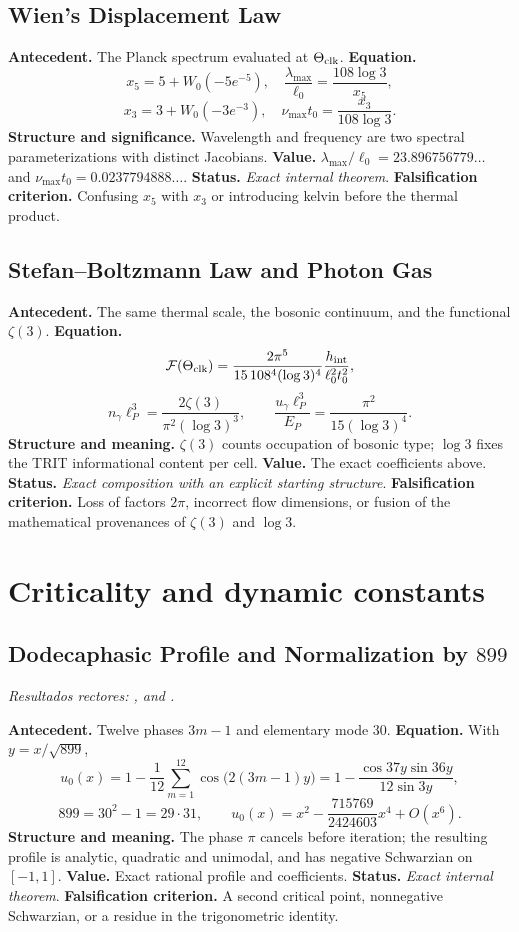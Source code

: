 \subsection*{Wien's Displacement Law }
\textbf{Antecedent.} The Planck spectrum evaluated at
\(\Theta_{\rm clk}\). \textbf{Equation.}
\[
x_5=5+W_0(-5e^{-5}),\quad
\frac{\lambda_{\max}}{\ell_0}=\frac{108\log3}{x_5},
\]
\[
x_3=3+W_0(-3e^{-3}),\quad
\nu_{\max}t_0=\frac{x_3}{108\log3}.
\]
\textbf{Structure and significance.} Wavelength and frequency are two
spectral parameterizations with distinct Jacobians. \textbf{Value.}
\(\lambda_{\max}/\ell_0=23.896756779\ldots\) and
\(\nu_{\max}t_0=0.0237794888\ldots\). \textbf{Status.}
\emph{Exact internal theorem}. \textbf{Falsification criterion.} Confusing \(x_5\) with \(x_3\) or
introducing kelvin before the thermal product.

\subsection*{Stefan–Boltzmann Law and Photon Gas }
\textbf{Antecedent.} The same thermal scale, the bosonic continuum, and the
functional \(\zeta(3)\). \textbf{Equation.}
\[
\mathcal F(\Theta_{\rm clk})
=\frac{2\pi^5}{15\,108^4(\log3)^4}
\frac{h_{\rm int}}{\ell_0^2t_0^2},
\]
\[
n_\gamma\ell_P^3=\frac{2\zeta(3)}{\pi^2(\log3)^3},
\qquad
\frac{u_\gamma\ell_P^3}{E_P}=\frac{\pi^2}{15(\log3)^4}.
\]
\textbf{Structure and meaning.} \(\zeta(3)\) counts occupation of bosonic type;
\(\log3\) fixes the TRIT informational content per cell. \textbf{Value.}
The exact
coefficients above. \textbf{Status.} \emph{Exact composition with an
explicit starting structure}. \textbf{Falsification criterion.} Loss of factors
\(2\pi\), incorrect flow dimensions, or fusion of the mathematical provenances of
\(\zeta(3)\) and \(\log3\).

\section{Criticality and dynamic constants}

\subsection*{Dodecaphasic Profile and Normalization by \(899\)}
\noindent\textit{Resultados rectores: , and
.}\par
\textbf{Antecedent.} Twelve phases \(3m-1\) and elementary mode \(30\).
\textbf{Equation.} With \(y=x/\sqrt{899}\),
\[
u_0(x)=1-\frac1{12}\sum_{m=1}^{12}
\cos\!\bigl(2(3m-1)y\bigr)
=1-\frac{\cos37y\sin36y}{12\sin3y},
\]
\[
899=30^2-1=29\cdot31,\qquad
u_0(x)=x^2-\frac{715769}{2424603}x^4+O(x^6).
\]
\textbf{Structure and meaning.} The phase \(\pi\) cancels before iteration; the resulting profile is analytic, quadratic and unimodal, and has negative Schwarzian on \([-1,1]\). \textbf{Value.} Exact rational profile and coefficients. \textbf{Status.} \emph{Exact internal theorem}. \textbf{Falsification criterion.} A second critical point, nonnegative Schwarzian, or a residue in the trigonometric identity.

